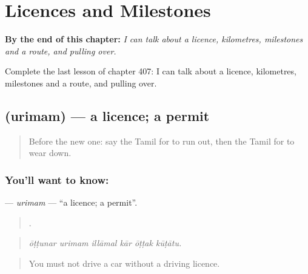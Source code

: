 
\chapter{Licences and Milestones}
\label{ch:ta-licences-and-milestones}

\begin{chapteropening}
\textbf{By the end of this chapter:} \emph{I can talk about a licence, kilometres, milestones and a route, and pulling over.}

Complete the last lesson of chapter 407: I can talk about a licence, kilometres, milestones and a route, and pulling over.
\end{chapteropening}

\section[\texorpdfstring{\ta{உரிமம்} (urimam)}{உரிமம் (urimam)}]{ (urimam) — a licence; a permit}

\label{lesson:TA-C407-urimam}



\begin{quote}
Before the new one: say the Tamil for to run out, then the Tamil for to wear down.
\end{quote}

\subsection*{You'll want to know: }
\textbf{} — \emph{urimam} — \textquotedblleft{}a licence; a permit\textquotedblright{}.

\begin{quote}
     .
\end{quote}

\begin{quote}
\emph{ōṭṭunar urimam illāmal kār ōṭṭak kūṭātu.}
\end{quote}

\begin{quote}
You must not drive a car without a driving licence.
\end{quote}

